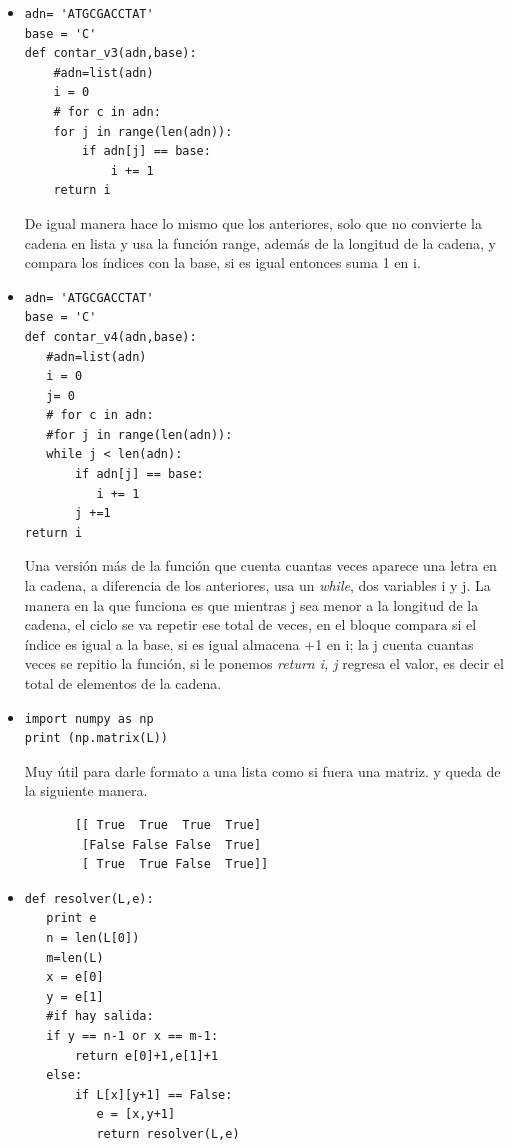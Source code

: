 \label{key}\documentclass[letterpaper, 12pt,oneside]{article}
\begin{document}
\begin{enumerate}
\begin{itemize}
				\item \begin{lstlisting}
adn= 'ATGCGACCTAT'
base = 'C'
def contar_v3(adn,base):
    #adn=list(adn)
    i = 0
    # for c in adn:
    for j in range(len(adn)):
        if adn[j] == base:
            i += 1
    return i
				\end{lstlisting} De igual manera hace lo mismo que los anteriores, solo que no convierte la cadena en lista y usa la función range, además de la longitud de la cadena, y compara los índices con la base, si es igual entonces suma 1 en i.\\
				
				
				\item \begin{lstlisting}
adn= 'ATGCGACCTAT'
base = 'C'
def contar_v4(adn,base):
   #adn=list(adn)
   i = 0
   j= 0
   # for c in adn:
   #for j in range(len(adn)):
   while j < len(adn):
       if adn[j] == base:
          i += 1
       j +=1
return i
				\end{lstlisting} Una versión más de la función que cuenta cuantas veces aparece una letra en la cadena, a diferencia de los anteriores, usa un \textit{while}, dos variables i y j. La manera en la que funciona es que mientras j sea menor a la longitud de la cadena, el ciclo se va repetir ese total de veces, en el bloque compara si el índice es igual a la base, si es igual almacena +1 en i; la j cuenta cuantas veces se repitio la función, si le ponemos \textit{return i, j} regresa el valor, es decir el total de elementos de la cadena. \\
			
					
				\item \begin{lstlisting}
import numpy as np
print (np.matrix(L)) 
				\end{lstlisting}  Muy útil para darle formato a una lista como si fuera una matriz. y queda de la siguiente manera.\\
				\begin{lstlisting}
       [[ True  True  True  True]
        [False False False  True]
        [ True  True False  True]]
				\end{lstlisting}
				
\newpage
				
				\item \begin{lstlisting}
def resolver(L,e):
   print e
   n = len(L[0])
   m=len(L)
   x = e[0]
   y = e[1]
   #if hay salida:
   if y == n-1 or x == m-1:
       return e[0]+1,e[1]+1 
   else:
       if L[x][y+1] == False:
          e = [x,y+1]
          return resolver(L,e)
  

\end{lstlisting}
\end{itemize}
\end{enumerate}
\end{document}
